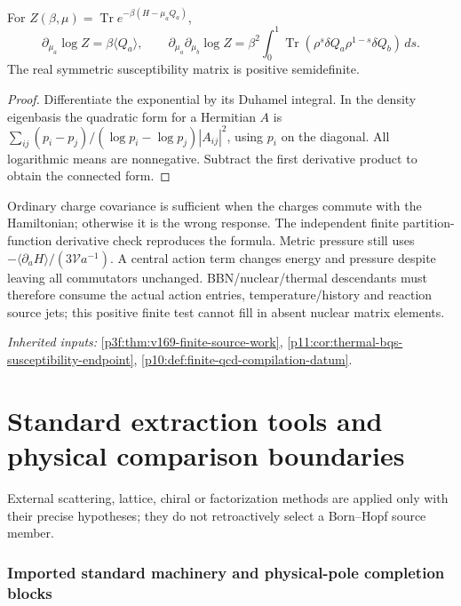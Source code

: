 \documentclass[12pt,a4paper]{article}
\begin{document}
For $Z(\beta,\mu)=\operatorname{Tr}e^{-\beta(H-\mu_aQ_a)}$,
\[
 \partial_{\mu_a}\log Z=\beta\langle Q_a\rangle,\qquad
 \partial_{\mu_a}\partial_{\mu_b}\log Z
 =\beta^2\int_0^1\operatorname{Tr}
 (\rho^s\delta Q_a\rho^{1-s}\delta Q_b)\,ds.
\]
The real symmetric susceptibility matrix is positive semidefinite.
\begin{proof}
Differentiate the exponential by its Duhamel integral.
In the density eigenbasis the quadratic form for a Hermitian $A$ is
$\sum_{ij}(p_i-p_j)/(\log p_i-\log p_j)|A_{ij}|^2$, using $p_i$ on
the diagonal. All logarithmic means are nonnegative. Subtract the first
derivative product to obtain the connected form.
\end{proof}
Ordinary charge covariance is sufficient when the charges commute with the
Hamiltonian; otherwise it is the wrong response. The independent finite
partition-function derivative check reproduces the formula.
Metric pressure still uses $-\langle\partial_aH\rangle/(3\mathcal Va^{-1})$.
A central action term changes energy and pressure despite leaving all
commutators unchanged. BBN/nuclear/thermal descendants must therefore
consume the actual action entries, temperature/history and reaction source
jets; this positive finite test cannot fill in absent nuclear matrix elements.
\par\noindent\textit{Inherited inputs:} \ref{p3f:thm:v169-finite-source-work}, \ref{p11:cor:thermal-bqs-susceptibility-endpoint}, \ref{p10:def:finite-qcd-compilation-datum}.




\section{Standard extraction tools and physical comparison boundaries}
\label{p11:sec:v237-b7}
External scattering, lattice, chiral or factorization methods are applied only with their precise hypotheses; they do not retroactively select a Born--Hopf source member.

\subsubsection{Imported standard machinery and physical-pole completion blocks}
\label{p11:sec:physical-pole-completion-blocks}
\end{document}
